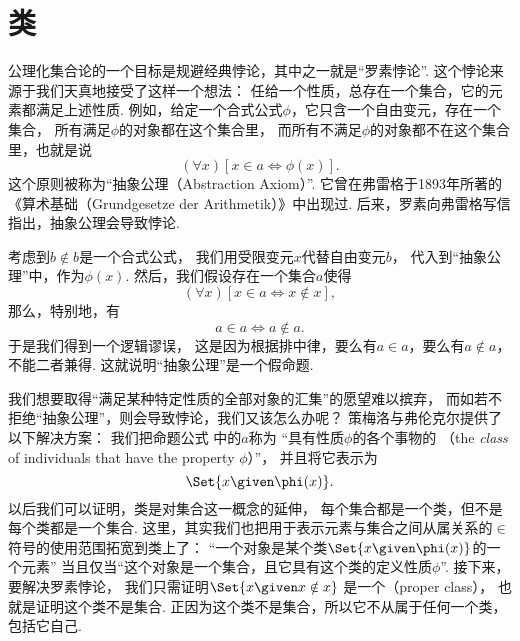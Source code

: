
\section{类}
公理化集合论的一个目标是规避经典悖论，其中之一就是“罗素悖论”.
这个悖论来源于我们天真地接受了这样一个想法：
任给一个性质，总存在一个集合，它的元素都满足上述性质.
例如，给定一个合式公式\(\phi\)，它只含一个自由变元，存在一个集合，
所有满足\(\phi\)的对象都在这个集合里，
而所有不满足\(\phi\)的对象都不在这个集合里，也就是说
\begin{equation}\label{equation:集合论.类的逻辑表示}
	(\forall x)[x \in a \iff \phi(x)].
\end{equation}
这个原则被称为“抽象公理（Abstraction Axiom）”.
它曾在弗雷格于1893年所著的《算术基础（Grundgesetze der Arithmetik）》中出现过.
后来，罗素向弗雷格写信指出，抽象公理会导致悖论.

考虑到\(b \notin b\)是一个合式公式，
我们用受限变元\(x\)代替自由变元\(b\)，
代入到“抽象公理”中，作为\(\phi(x)\).
然后，我们假设存在一个集合\(a\)使得\begin{equation*}
	(\forall x)[x \in a \iff x \notin x],
\end{equation*}
那么，特别地，有\begin{equation*}
	a \in a \iff a \notin a.
\end{equation*}
于是我们得到一个逻辑谬误，
这是因为根据排中律，要么有\(a \in a\)，要么有\(a \notin a\)，不能二者兼得.
这就说明“抽象公理”是一个假命题.

我们想要取得“满足某种特定性质的全部对象的汇集”的愿望难以摈弃，
而如若不拒绝“抽象公理”，则会导致悖论，我们又该怎么办呢？
策梅洛与弗伦克尔提供了以下解决方案：
我们把命题公式  中的\(a\)称为%
“具有性质\(\phi\)的各个事物的%
（the \emph{class} of individuals that have the property \(\phi\)）”，
并且将它表示为
\begin{equation}
	\Set{ x \given \phi(x) }.
\end{equation}
以后我们可以证明，类是对集合这一概念的延伸，
每个集合都是一个类，但不是每个类都是一个集合.
这里，其实我们也把用于表示元素与集合之间从属关系的\(\in\)符号的使用范围拓宽到类上了：
“一个对象是某个类\(\Set{ x \given \phi(x) }\)的一个元素”%
当且仅当“这个对象是一个集合，且它具有这个类的定义性质\(\phi\)”.
接下来，要解决罗素悖论，
我们只需证明\(\Set{ x \given x \notin x }\)%
是一个（proper class），
也就是证明这个类不是集合.
正因为这个类不是集合，所以它不从属于任何一个类，包括它自己.

